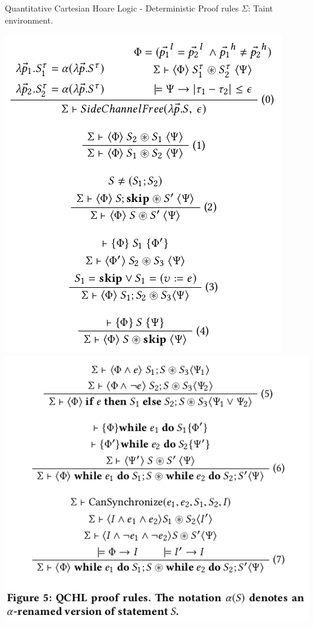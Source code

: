 \documentclass[page number]{beamer}
\begin{document}
\begin{frame}{Quantitative Cartesian Hoare Logic - Deterministic Proof rules}
  $\Sigma$: Taint environment.
\begin{center}
    \includegraphics[scale=0.3]{img_chen/51.png}
    \includegraphics[scale=0.3]{img_chen/52.png}
\end{center}
\end{frame}
\end{document}
